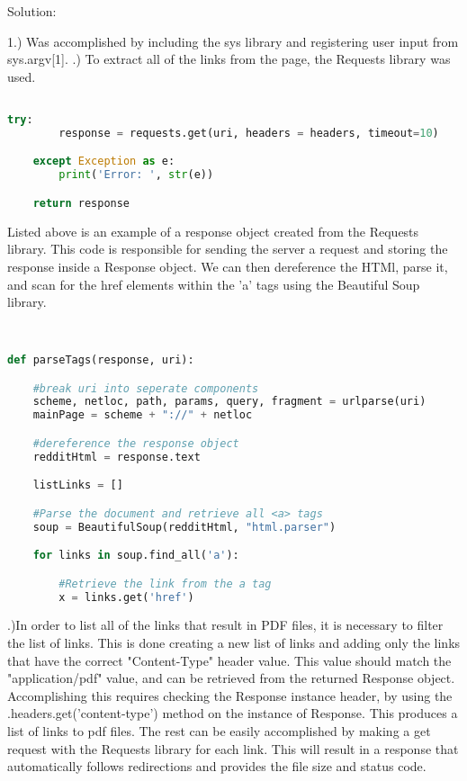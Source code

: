 \documentclass[11pt]{scrartcl} %
\begin{document}
\bigskip\bigskip
\Large Solution: \newline\newline\small

1.) Was accomplished by including the sys library and registering user input from sys.argv[1]. .) To extract all of the links from the page, the Requests library was used. 

\begin{lstlisting}[language = Python, caption=Create Response Object]

try:
		response = requests.get(uri, headers = headers, timeout=10)

	except Exception as e:
		print('Error: ', str(e))

	return response

\end{lstlisting} \bigskip \bigskip

 Listed above is an example of a response object created from the Requests library. This code is responsible for sending the server a request and storing the response inside a Response object. We can then dereference the HTMl, parse it, and scan for the href elements within the 'a' tags using the Beautiful Soup library. 

\begin{lstlisting}[language = Python, caption=Dereference and scan for tags]


def parseTags(response, uri):

	#break uri into seperate components
	scheme, netloc, path, params, query, fragment = urlparse(uri)
	mainPage = scheme + "://" + netloc

	#dereference the response object
	redditHtml = response.text

	listLinks = []

	#Parse the document and retrieve all <a> tags
	soup = BeautifulSoup(redditHtml, "html.parser")

	for links in soup.find_all('a'):

		#Retrieve the link from the a tag
		x = links.get('href')

\end{lstlisting} \bigskip \bigskip

 
.)In order to list all of the links that result in PDF files, it is necessary to filter the list of links. This is done creating a new list of links and adding only the links that have the correct "Content-Type" header value. \newline
This value should match the "application/pdf" value, and can be retrieved from the returned Response object. Accomplishing this requires checking the Response instance header, by using the .headers.get('content-type') method on the instance of Response. This produces a list of links to pdf files. \newline 
The rest can be easily accomplished by making a get request with the Requests library for each link. This will result in a response that automatically follows redirections and provides the file size and status code.
\end{document}
